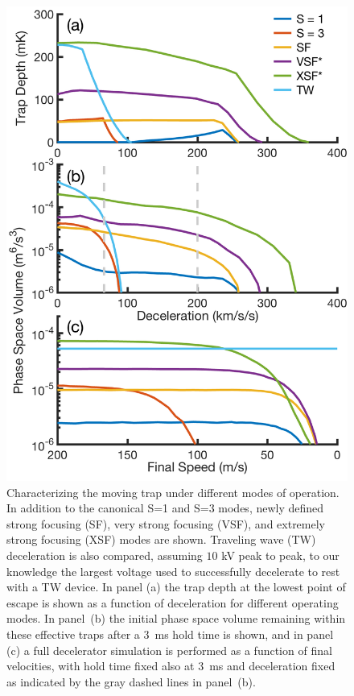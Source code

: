 \documentclass[%
 reprint,
 amsmath,amssymb,
 aps,
prl,
]{revtex4-1}
\begin{document}
\begin{figure}[t]
\includegraphics[width=\linewidth]{full-three-panel.png}%
\vspace{-5pt}
\caption{
Characterizing the moving trap under different modes of operation. In addition to the canonical S=1 and S=3 modes, newly defined strong focusing (SF), very strong focusing (VSF), and extremely strong focusing (XSF) modes are shown. Traveling wave (TW) deceleration is also compared, assuming $10$ kV peak to peak, to our knowledge the largest voltage used to successfully decelerate to rest with a TW device. In panel (a) the trap depth at the lowest point of escape is shown as a function of deceleration for different operating modes. In panel~(b) the initial phase space volume remaining within these effective traps after a $3$~ms hold time is shown, and in panel (c) a full decelerator simulation is performed as a function of final velocities, with hold time fixed also at $3$~ms and deceleration fixed as indicated by the gray dashed lines in panel~(b).\vspace{-4mm}}
\label{fig:efftrap}
\end{figure}
\end{document}
